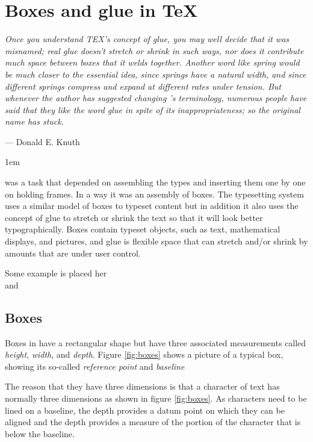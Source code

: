 

\chapter{Boxes and glue in TeX}

\setlength{\columnsep}{2em}
{\it Once you understand TEX's concept of glue, you may well decide that
it was misnamed; real glue doesn't stretch or shrink in such ways, nor does it
contribute much space between boxes that it welds together. Another word like
\emph{spring} would be much closer to the essential idea, since springs have a natural
width, and since different springs compress and expand at different rates
under tension. But whenever the author has suggested changing \tex's terminology,
numerous people have said that they like the word \emph{glue} in spite of its
inappropriateness; so the original name has stuck. }
\smallskip

{\hfill  ---  Donald E. Knuth}

\medskip   %



\parindent1em




 was a task that depended on assembling the types and inserting them one by one on holding frames. In a way it was an assembly of boxes.
The \tex typesetting system uses a similar model of boxes to typeset content but in addition it also uses the concept of glue to stretch or shrink the text so that it will look better typographically. Boxes contain
typeset objects, such as text, mathematical displays, and pictures, and glue
is flexible space that can stretch and/or shrink by amounts that are under
user control.

\topline

Some example is placed her\\
and

\bottomline

\section*{Boxes}

Boxes in \tex have  a rectangular shape but have
three associated measurements called \emph{height}, \emph{width}, and \emph{depth}.
Figure \ref{fig:boxes} shows a 
picture of a typical box, showing its so-called \emph{reference point} and \emph{baseline}

The reason that they have three dimensions is that a character of text has normally three dimensions as shown in figure \ref{fig:boxes}. As characters need to be lined on a baseline, the depth provides a datum point on which they can be aligned and the depth provides a measure of the portion of the character that is below the baseline.


